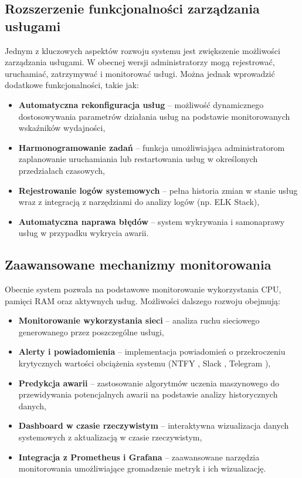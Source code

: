 \subsection{Rozszerzenie funkcjonalności zarządzania usługami}
Jednym z kluczowych aspektów rozwoju systemu jest zwiększenie możliwości zarządzania usługami. W obecnej wersji administratorzy mogą rejestrować, uruchamiać, zatrzymywać i monitorować usługi. Można jednak wprowadzić dodatkowe funkcjonalności, takie jak:
\begin{itemize}
    \item \textbf{Automatyczna rekonfiguracja usług} – możliwość dynamicznego dostosowywania parametrów działania usług na podstawie monitorowanych wskaźników wydajności,
    \item \textbf{Harmonogramowanie zadań} – funkcja umożliwiająca administratorom zaplanowanie uruchamiania lub restartowania usług w określonych przedziałach czasowych,
    \item \textbf{Rejestrowanie logów systemowych} – pełna historia zmian w stanie usług wraz z integracją z narzędziami do analizy logów (np. ELK Stack),
    \item \textbf{Automatyczna naprawa błędów} – system wykrywania i samonaprawy usług w przypadku wykrycia awarii.
\end{itemize}

\subsection{Zaawansowane mechanizmy monitorowania}
Obecnie system pozwala na podstawowe monitorowanie wykorzystania CPU, pamięci RAM oraz aktywnych usług. Możliwości dalszego rozwoju obejmują:
\begin{itemize}
    \item \textbf{Monitorowanie wykorzystania sieci} – analiza ruchu sieciowego generowanego przez poszczególne usługi,
    \item \textbf{Alerty i powiadomienia} – implementacja powiadomień o przekroczeniu krytycznych wartości obciążenia systemu (NTFY \cite{NTFY}, Slack \cite{Slack}, Telegram \cite{Telegram}),
    \item \textbf{Predykcja awarii} – zastosowanie algorytmów uczenia maszynowego do przewidywania potencjalnych awarii na podstawie analizy historycznych danych,
    \item \textbf{Dashboard w czasie rzeczywistym} – interaktywna wizualizacja danych systemowych z aktualizacją w czasie rzeczywistym,
    \item \textbf{Integracja z Prometheus i Grafana} – zaawansowane narzędzia monitorowania umożliwiające gromadzenie metryk i ich wizualizację.
\end{itemize}

